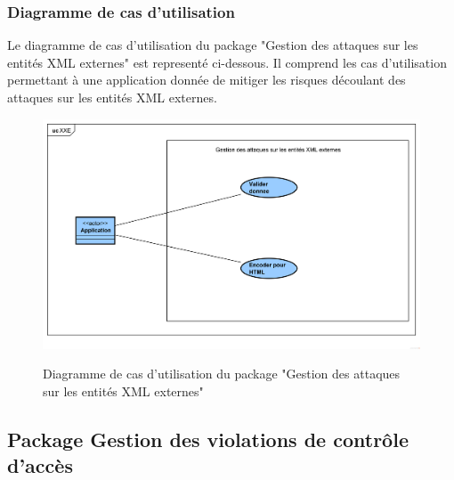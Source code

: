 \subsubsection{Diagramme de cas d'utilisation}
Le diagramme de cas d'utilisation du package "Gestion des attaques sur les entités XML externes" est representé ci-dessous. Il comprend les cas d'utilisation permettant à une application donnée de mitiger les risques découlant des attaques sur les entités XML externes.\\ 
\begin{figure}[H]
	\centering
	\begin{minipage}{18cm}
		\centering
		{\includegraphics[height=0.30\textheight]{fig/XXE-use-case-diagram.png}}
	\end{minipage}
	\caption{Diagramme de cas d'utilisation du package "Gestion des attaques sur les entités XML externes"}
	\label{fig:7.5}
\end{figure}

\subsection{Package Gestion des violations de contrôle d'accès}
